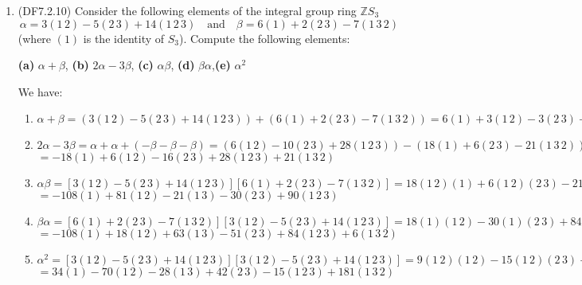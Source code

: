 \documentclass[11pt]{article}
\begin{document}
\begin{enumerate}
    \item (DF7.2.10) Consider the following elements of the integral group ring $\mathbb{Z}S_3$ \[\alpha = 3(1\, 2) - 5(2\, 3) + 14(1\,2\,3) \quad \text{and}\quad \beta = 6(1) + 2(2\,3) -7(1\,3\,2)\] (where $(1)$ is the identity of $S_3$). Compute the following elements:
    
    \textbf{(a)} $\alpha + \beta$, \quad \textbf{(b)} $2\alpha - 3\beta$, \quad \textbf{(c)} $\alpha\beta$, \quad \textbf{(d)} $\beta\alpha$,\quad \textbf{(e)} $\alpha^2$

    We have:
    \begin{enumerate}[label=\textbf{(\alph*)}]
        \item $\alpha + \beta = (3(1\, 2) - 5(2\, 3) + 14(1\,2\,3)) + (6(1) + 2(2\,3) -7(1\,3\,2)) = \boxed{6(1) + 3(1\,2) -3(2\,3)+ 14(1\,2\,3)-7(1\,3\,2)}$
        \item  $2\alpha - 3\beta = \alpha + \alpha +(- \beta - \beta - \beta) = (6(1\, 2) - 10(2\, 3) + 28(1\,2\,3)) - (18(1) + 6(2\,3) -21(1\,3\,2))$ $= \boxed{-18(1) + 6(1\,2) - 16(2\,3)+28(1\,2\,3) +21(1\,3\,2)}$
        \item $\alpha\beta= [3(1\, 2) - 5(2\, 3) + 14(1\,2\,3)][6(1) + 2(2\,3) -7(1\,3\,2)] = 18(1\,2)(1) + 6(1\,2)(2\,3)- 21(1\,2)(1\,3\,2) - 30 (2\,3)(1) -10 (2\,3)(2\,3) + 35(2\,3)(1\,3\,2) + 84(1\,2\,3)(1) + 28(1\,2\,3)(2\,3) - 98(1\,2\,3)(1\,3\,2)$ \newline$= \boxed{-108(1) + 81(1\,2) -21 (1\,3)-30(2\,3) + 90(1\,2\,3)}$
        \item $\beta\alpha= [6(1) + 2(2\,3) -7(1\,3\,2)][3(1\, 2) - 5(2\, 3) + 14(1\,2\,3)] = 18(1)(1\,2)-30(1)(2\,3) + 84(1)(1\,2\,3) + 6(2\,3)(1\,2) - 10(2\,3)(2\,3) + 28(2\,3)(1\,2\,3) - 21(1\,3\,2)(1\,2) + 35(1\,3\,2)(2\,3)-98(1\,3\,2)(1\,2\,3)$\newline $= \boxed{-108(1) + 18(1\,2) + 63(1\,3) - 51(2\,3) + 84(1\,2\,3) + 6(1\,3\,2)}$
        \item $\alpha^2 = [3(1\, 2) - 5(2\, 3) + 14(1\,2\,3)][3(1\, 2) - 5(2\, 3) + 14(1\,2\,3)] = 9(1\,2)(1\,2) - 15(1\,2)(2\,3)+42(1\,2)(1\,2\,3) - 15(2\,3)(1\,2) + 25(2\,3)(2\,3) - 70(2\,3)(1\,2\,3) + 42(1\,2\,3)(1\,2) - 70(1\,2\,3)(2\,3)+196(1\,2\,3)(1\,2\,3)$\newline $= \boxed{34(1) - 70(1\,2) - 28(1\,3) + 42(2\,3) - 15(1\,2\,3)+181(1\,3\,2)}$
    \end{enumerate}
    

\end{enumerate}
\end{document}

